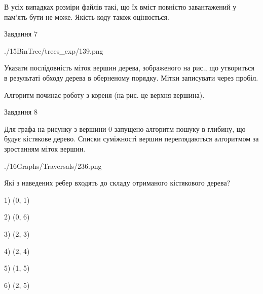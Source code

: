\documentclass[12pt, ukrainian]{article}
\begin{document}
{В усіх випадках розміри файлів такі, що їх вміст повністю завантажений у пам'ять бути не може. Якість коду також оцінюється.



\vspace{10mm}\par

\newpage
\begin{minipage}[t]{9.7cm}
               
{\begin{center}Завдання {7}\end{center}}
\vspace{-6mm}

\begin{center}
	{./15BinTree/trees_exp/139.png}
\end{center}
Указати послідовність міток вершин дерева, зображеного на рис., що утвориться в результаті обходу дерева в оберненому порядку. Мітки записувати через пробіл.\par Алгоритм починає роботу з кореня (на рис. це верхня вершина).\par

\end{minipage}
\vline \hspace{8mm}
\begin{minipage}[t]{8.0cm}
               
{\begin{center}Завдання {8}\end{center}}
\vspace{-6mm}
Для графа на рисунку з вершини 0 запущено алгоритм пошуку в глибину, що будує кістякове дерево. Списки суміжності вершин переглядаються алгоритмом за зростанням міток вершин.\par
\begin{center}
	{./16Graphs/Traversals/236.png}
\end{center}
\par Які з наведених ребер входять до складу отриманого кістякового дерева?\par
1) (0, 1)\par
2) (0, 6)\par
3) (2, 3)\par
4) (2, 4)\par
5) (1, 5)\par
6) (2, 5)\par
{\vskip 15pt} \par


\end{minipage}}
\end{document}
